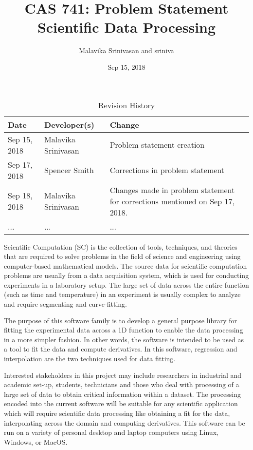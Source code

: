 \documentclass{article}
\title{CAS 741: Problem Statement\\ Scientific Data Processing}
\author{Malavika Srinivasan and sriniva}
\date{Sep 15, 2018}
\begin{document}
\maketitle

\begin{table}[hp]
\caption{Revision History} \label{TblRevisionHistory}
\begin{tabularx}{\textwidth}{llX}
\toprule
\textbf{Date} & \textbf{Developer(s)} & \textbf{Change}\\
\midrule
Sep 15, 2018 & Malavika Srinivasan & Problem statement creation\\
Sep 17, 2018 & Spencer Smith & Corrections in problem statement\\
Sep 18, 2018 & Malavika Srinivasan & 
Changes made in problem statement for corrections mentioned on Sep 17, 2018.\\
... & ... & ...\\
\bottomrule
\end{tabularx}
\end{table}

Scientific Computation (SC) is the collection of tools, techniques, and
theories that are required to solve problems in the field of science and
engineering using computer-based mathematical models. The source data for
scientific computation problems are usually 
from a data acquisition system, 
which is used for conducting experiments in a laboratory setup. The large set
of data across the entire function (such as time and temperature) in an
experiment is usually complex to analyze and require segmenting and
curve-fitting.

The purpose of this software family is to 
develop a general purpose library  for fitting the 
experimental data across a 1D function to enable the data processing in a more simpler
fashion. In other words, the software is intended to be used as a tool to fit the data and compute
derivatives. 
In this software, regression and interpolation are the two techniques used for
data fitting.

Interested stakeholders in this project may include researchers in industrial
and academic set-up, students, technicians and those who deal with processing of
a large set of data to obtain critical information within a dataset. The
processing encoded into the current software will be suitable for any scientific
application which will require scientific data processing like obtaining a fit
for the data, interpolating across the domain and computing derivatives.  This software can be run on a variety of
personal desktop and laptop computers using Linux, Windows, or MacOS.





\end{document}
